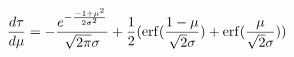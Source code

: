 
\begin{align} 
\frac{d\tau}{d\mu} &= -\frac{e^{-\frac{{-1+\mu}^2}{2\sigma^2}}}{\sqrt{2\pi}\sigma} + \frac{1}{2}(\operatorname{erf}(\frac{1-\mu}{\sqrt{2}\sigma})+\operatorname{erf}(\frac{\mu}{\sqrt{2}\sigma})) 
\end{align}

